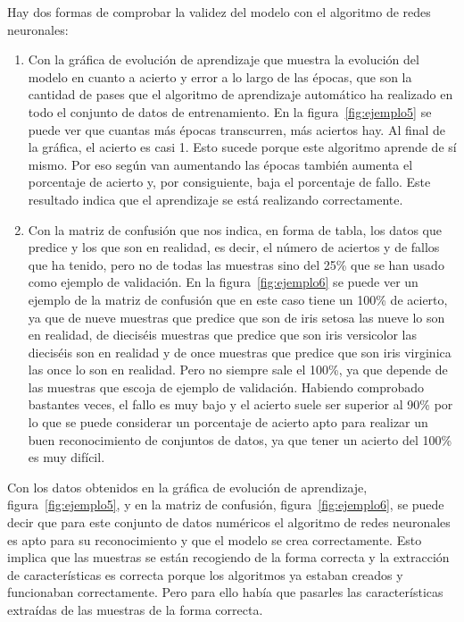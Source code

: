 \documentclass[a4paper, 12pt]{book}
\begin{document}
Hay dos formas de comprobar la validez del modelo con el algoritmo de redes neuronales:

\begin{enumerate}
 \item Con la gráfica de evolución de aprendizaje que muestra la evolución del modelo en cuanto a acierto y error a lo largo de las épocas, que son la cantidad de pases que el algoritmo de aprendizaje automático ha realizado en todo el conjunto de datos de entrenamiento. En la figura~\ref{fig:ejemplo5} se puede ver que cuantas más épocas transcurren, más aciertos hay. Al final de la gráfica, el acierto es casi 1. Esto sucede porque este algoritmo aprende de sí mismo.
Por eso según van aumentando las épocas también aumenta el porcentaje de acierto y, por consiguiente, baja el porcentaje de fallo. Este resultado indica que el aprendizaje se está realizando correctamente.
 \item Con la matriz de confusión que nos indica, en forma de tabla, los datos que predice y los que son en realidad, es decir, el número de aciertos y de fallos que ha tenido, pero no de todas las muestras sino del 25\% que se han usado como ejemplo de validación. 
En la figura~\ref{fig:ejemplo6} se puede ver un ejemplo de la matriz de confusión que en este caso tiene un 100\% de acierto, ya que de nueve muestras que predice que son de iris setosa las nueve lo son en realidad, de dieciséis muestras que predice que son iris versicolor las dieciséis son en realidad y de once muestras que predice que son iris virginica las once lo son en realidad.
Pero no siempre sale el 100\%, ya que depende de las muestras que escoja de ejemplo de validación. Habiendo comprobado bastantes veces, el fallo es muy bajo y el acierto suele ser superior al 90\% por lo que se puede considerar un porcentaje de acierto apto para realizar un buen reconocimiento de conjuntos de datos, ya que tener un acierto del 100\% es muy difícil.
 \end{enumerate} 

Con los datos obtenidos en la gráfica de evolución de aprendizaje, figura~\ref{fig:ejemplo5}, y en la matriz de confusión, figura~\ref{fig:ejemplo6}, se puede decir que para este conjunto de datos numéricos el algoritmo de redes neuronales es apto para su reconocimiento y que el modelo se crea correctamente.  Esto implica que las muestras se están recogiendo de la forma correcta y la extracción de características es correcta porque los algoritmos ya estaban creados y funcionaban correctamente. Pero para ello había que pasarles las características extraídas de las muestras de la forma correcta.
\end{document}
